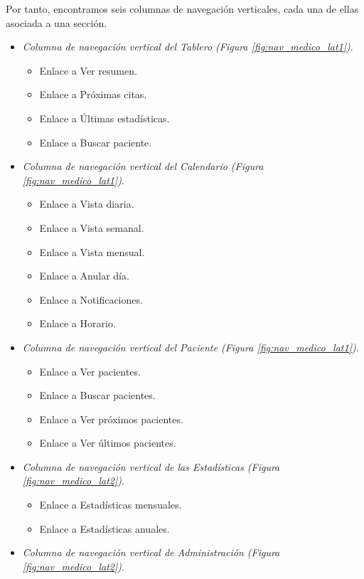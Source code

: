 			Por tanto, encontramos seis columnas de navegación verticales, cada una de ellas asociada a una sección.
			\begin{itemize}
				\item \textit{Columna de navegación vertical del Tablero (Figura \ref{fig:nav_medico_lat1})}. 
					\begin{itemize}
						\item Enlace a Ver resumen.
						\item Enlace a Próximas citas.
						\item Enlace a Últimas estadísticas.
						\item Enlace a Buscar paciente.
					\end{itemize}
				\item \textit{Columna de navegación vertical del Calendario (Figura \ref{fig:nav_medico_lat1})}.
					\begin{itemize}
						\item Enlace a Vista diaria.
						\item Enlace a Vista semanal.
						\item Enlace a Vista mensual.
						\item Enlace a Anular día.
						\item Enlace a Notificaciones.
						\item Enlace a Horario.
					\end{itemize}
				\item \textit{Columna de navegación vertical del Paciente (Figura \ref{fig:nav_medico_lat1})}.
					\begin{itemize}
						\item Enlace a Ver pacientes.
						\item Enlace a Buscar pacientes.
						\item Enlace a Ver próximos pacientes.
						\item Enlace a Ver últimos pacientes.
					\end{itemize}
				\item \textit{Columna de navegación vertical de las Estadísticas (Figura \ref{fig:nav_medico_lat2})}.
					\begin{itemize}
						\item Enlace a Estadísticas mensuales.
						\item Enlace a Estadísticas anuales.
					\end{itemize}
				\item \textit{Columna de navegación vertical de Administración (Figura \ref{fig:nav_medico_lat2})}.

\end{itemize}
